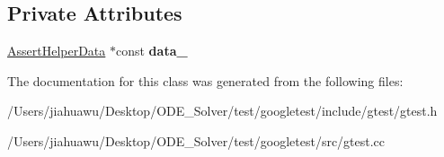 \subsection*{Private Attributes}
\begin{DoxyCompactItemize}
\item 
\mbox{\label{classtesting_1_1internal_1_1_assert_helper_af69a4d66a929d0c6e419f4efd3ba6b3a}} 
\mbox{\hyperlink{structtesting_1_1internal_1_1_assert_helper_1_1_assert_helper_data}{Assert\+Helper\+Data}} $\ast$const {\bfseries data\+\_\+}
\end{DoxyCompactItemize}


The documentation for this class was generated from the following files\+:\begin{DoxyCompactItemize}
\item 
/\+Users/jiahuawu/\+Desktop/\+O\+D\+E\+\_\+\+Solver/test/googletest/include/gtest/gtest.\+h\item 
/\+Users/jiahuawu/\+Desktop/\+O\+D\+E\+\_\+\+Solver/test/googletest/src/gtest.\+cc\end{DoxyCompactItemize}
